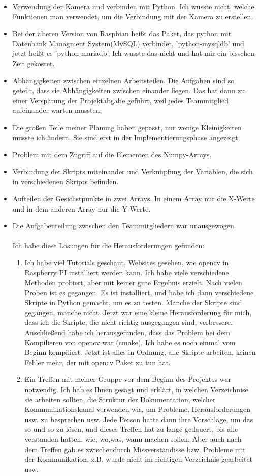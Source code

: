 \begin{itemize}
	\item Verwendung der Kamera und verbinden mit Python. Ich wusste nicht, welche Funktionen man verwendet, um die Verbindung mit der Kamera zu erstellen. 
	\item Bei der \"alteren Version von Raspbian hei{\ss}t das Paket, das python mit Datenbank Managment System(MySQL) verbindet, 'python-mysqldb' und jetzt hei{\ss}t es 'python-mariadb'. Ich wusste das nicht und hat mir ein bisschen Zeit gekostet.
	\item Abh\"angigkeiten zwischen einzelnen Arbeitsteilen. Die Aufgaben sind so geteilt, dass sie Abh\"angigkeiten zwischen einander liegen. Das hat dann zu einer Versp\"atung der Projektabgabe gef\"uhrt, weil jedes Teammitglied aufeinander warten mussten.
	\item Die gro{\ss}en Teile meiner Planung haben gepasst, nur wenige Kleinigkeiten musste ich \"andern. Sie sind erst in der Implementierungsphase angezeigt.
	\item Problem mit dem Zugriff auf die Elementen des Numpy-Arrays.
	\item Verbindung der Skripts miteinander und Verkn\"upfung der Variablen, die sich in verschiedenen Skripts befinden.
	\item Aufteilen der Gesichstpunkte in zwei Arrays. In einem Array nur die X-Werte und in dem anderen Array nur die Y-Werte. 
	\item Die Aufgabenteilung zwischen den Teammitgliedern war unausgewogen. 
	\\
	\\
Ich habe diese L\"osungen f\"ur die Herausforderungen gefunden: 
\begin{enumerate}
	\item Ich habe viel Tutorials geschaut, Websites gesehen, wie opencv in Raspberry PI installiert werden kann. Ich habe viele verschiedene Methoden probiert, aber mit keiner gute Ergebnis erzielt. Nach vielen Proben ist es gegangen. Es ist installiert, und habe ich dann verschiedene Skripte in Python gemacht, um es zu testen. Manche der Skripte sind gegangen, manche nicht. Jetzt war eine kleine Herausforderung f\"ur mich, dass ich die Skripte, die nicht richtig ausgegangen sind, verbessere. Anschlie{\ss}end habe ich herausgefunden, dass das Problem bei dem Kompilieren von opencv war (cmake). Ich habe es noch einmal vom Beginn kompiliert. Jetzt ist alles in Ordnung, alle Skripte arbeiten, keinen Fehler mehr, der mit opencv Paket zu tun hat.
	
	\item Ein Treffen mit meiner Gruppe vor dem Beginn des Projektes war notwendig. Ich hab es Ihnen gesagt und erkl\"art, in welchen Verzeichnise sie arbeiten sollten, die Struktur der Dokumentation, welcher Kommunikationskanal verwenden wir, um Probleme, Herausforderungen usw. zu besprechen usw. Jede Person hatte dann ihre Vorschl\"age, um das so und so zu l\"osen, und dieses Treffen hat zu lange gedauert, bis alle verstanden hatten, wie, wo,was, wann machen sollen. Aber auch nach dem Treffen gab es zwischendurch Missverst\"andisse bzw. Probleme mit der Kommunikation, z.B. wurde nicht im richtigen Verzeichnis gearbeitet usw. 
	

\end{enumerate}
\end{itemize}
